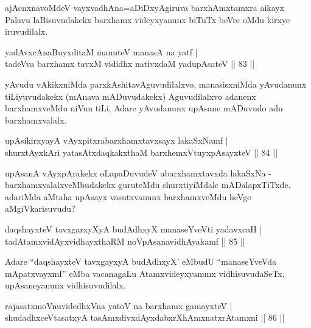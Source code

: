 \begin{artha}
ajAcnxnavoMdeV vayxvadhAna=aDiDxyAgiruva barxhAmxtamxra aikayx Palavu laBisuvudakekx barxhamx videyxyanunx biTuTx beVre oMdu kirxye iruvudilalx.
\end{artha}

  
  \begin{shl}
yadAvxcA\s naBuyxditaM manuteV manasA na yatf |\\
tadeVva barxhamx tavxM vididhx  nativxdaM yadupAsateV \hfill || 83 ||
\end{shl}

\begin{artha}
yAvudu vAkikxniMda parxkAshitavAguvudilalxvo, manasisxniMda yAvudanunx tiLiyuvudakekx (mAnava mADuvudakekx) Aguvudilalxvo adanenx barxhamxveMdu niVnu tiLi, Adare yAvudanunx upAsane mADuvudo adu barxhamxvalalx.
\end{artha}

\begin{shl}
upAsikirxyayA vAyxpitxrabarxhamxtavxsayx lakaSxNamf |\\
shurxtAyx\s kAri yatasAtxdaqkakxthaM barxhemxVtuyxpAsayxteV \hfill || 84 ||
\end{shl}

\begin{artha}
upAsanA vAyxpArakekx oLapaDuvudeV abarxhamxtavxda lakaSxNa - barxhamxvalalxveMbudakekx guruteMdu shurxtiyiMdale mADalapxTiTxde. adariMda aMtaha upAsayx vasutxvanunx barxhamxveMdu heVge aMgiVkarisuvudu?
\end{artha}

\begin{shl}
daqshayxteV tavxgarxyXyA budAdhxyX manaseYveVti yadavxcaH |\\
tadAtamxvidAyxvidhayxthaRM noVpAsanavidhAyakamf \hfill || 85 ||
\end{shl}

\begin{artha}
Adare ``daqshayxteV tavxgayxyA budAdhxyX' eMbudU ``manaseYveVda mApatxvayxmf'' eMba vacanagaLu Atamxvideyxyanunx vidhisuvudaSeTx, upAsaneyanunx vidhisuvudilalx.
\end{artha}

\begin{shl}
rajasatxmoVnuvidedhxVna yatoV na barxhamx gamayxteV |\\
shudadhxceVtasatxyA tasAmxdivxdAyxdabxrXhAmxnatxrAtamxni \hfill || 86 ||
\end{shl}

